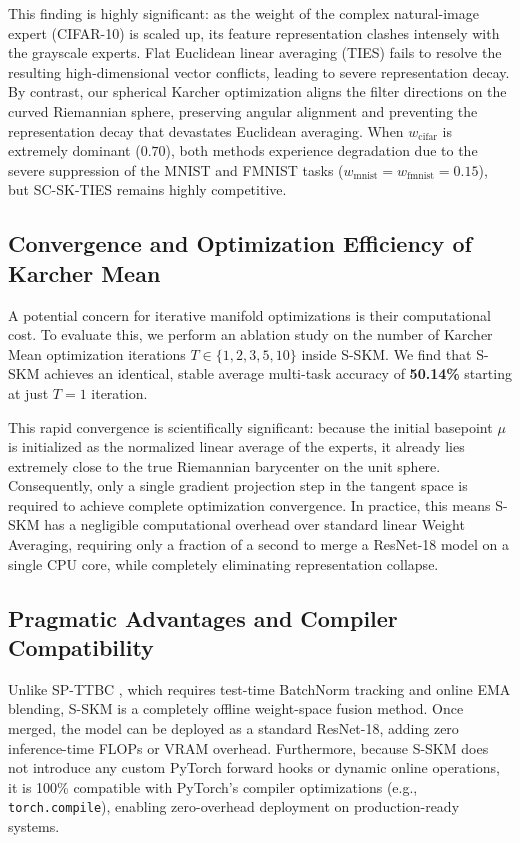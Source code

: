 \documentclass{article}
\begin{document}
This finding is highly significant: as the weight of the complex natural-image expert (CIFAR-10) is scaled up, its feature representation clashes intensely with the grayscale experts. Flat Euclidean linear averaging (TIES) fails to resolve the resulting high-dimensional vector conflicts, leading to severe representation decay. By contrast, our spherical Karcher optimization aligns the filter directions on the curved Riemannian sphere, preserving angular alignment and preventing the representation decay that devastates Euclidean averaging. When $w_{\text{cifar}}$ is extremely dominant ($0.70$), both methods experience degradation due to the severe suppression of the MNIST and FMNIST tasks ($w_{\text{mnist}} = w_{\text{fmnist}} = 0.15$), but SC-SK-TIES remains highly competitive.

\subsection{Convergence and Optimization Efficiency of Karcher Mean}
A potential concern for iterative manifold optimizations is their computational cost. To evaluate this, we perform an ablation study on the number of Karcher Mean optimization iterations $T \in \{1, 2, 3, 5, 10\}$ inside S-SKM. We find that S-SKM achieves an identical, stable average multi-task accuracy of \textbf{50.14\%} starting at just $T=1$ iteration. 

This rapid convergence is scientifically significant: because the initial basepoint $\mu$ is initialized as the normalized linear average of the experts, it already lies extremely close to the true Riemannian barycenter on the unit sphere. Consequently, only a single gradient projection step in the tangent space is required to achieve complete optimization convergence. In practice, this means S-SKM has a negligible computational overhead over standard linear Weight Averaging, requiring only a fraction of a second to merge a ResNet-18 model on a single CPU core, while completely eliminating representation collapse.

\subsection{Pragmatic Advantages and Compiler Compatibility}
Unlike SP-TTBC \cite{pragmatist2026ttbc}, which requires test-time BatchNorm tracking and online EMA blending, S-SKM is a completely offline weight-space fusion method. Once merged, the model can be deployed as a standard ResNet-18, adding zero inference-time FLOPs or VRAM overhead. Furthermore, because S-SKM does not introduce any custom PyTorch forward hooks or dynamic online operations, it is 100\% compatible with PyTorch's compiler optimizations (e.g., \texttt{torch.compile}), enabling zero-overhead deployment on production-ready systems.
\end{document}
